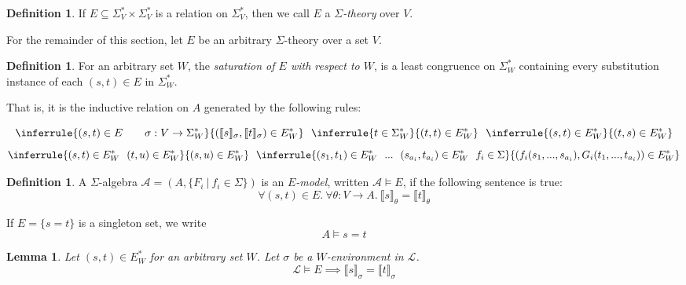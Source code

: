 \documentclass{msthesis}
\newtheorem{lemma}[theorem]{Lemma}
\theoremstyle{definition}
\newtheorem{definition}[theorem]{Definition}
\newcommand{\semof}[1]{\llbracket{#1}\rrbracket}
\newcommand{\Lmod}{\mathscr{L}}
\newcommand{\Amod}{\mathscr{A}}
\begin{document}
\begin{definition}
    If $E \subseteq \Sigma^*_V \times \Sigma^*_V$ is a relation on $\Sigma^*_V$, then we call 
    $E$ a \emph{$\Sigma$-theory} over $V$.
\end{definition}

For the remainder of this section, let $E$ be an arbitrary $\Sigma$-theory over a set $V$.
    
\begin{definition}
    For an arbitrary set $W$, the \emph{saturation of $E$ with respect to $W$}, is a least congruence on $\Sigma^*_W$ containing every substitution instance of each $(s,t)\in E$ in $\Sigma^*_W$. 
    
    That is, it is the inductive relation on $A$ generated by the following rules:
    
\[
    \inferrule{(s, t) \in E \qquad \sigma : V \to \Sigma^*_W}{(\semof{s}_\sigma, \semof{t}_\sigma) \in \thof{W}}\ \ \inferrule{t \in \Sigma^*_W}{(t, t) \in \thof{W}}\ \ \inferrule{(s, t) \in \thof{W}}{(t, s) \in \thof{W}}
\]
\[
    \inferrule{(s, t) \in \thof{W}\ \ (t, u) \in \thof{W}}{(s, u) \in \thof{W}}\ \  \inferrule{(s_1, t_1) \in \thof{W}\ \ ...\ \ (s_{a_i}, t_{a_i}) \in \thof{W}\ \ f_i \in \Sigma}{(f_i(s_1, ..., s_{a_i}), G_i(t_1, ..., t_{a_i})) \in \thof{W}}
\]
\end{definition}

\begin{definition}\label{def:models}
A $\Sigma$-algebra $\Amod = (A, \{F_i\ |\ f_i \in \Sigma\})$ is an \textit{$E$-model}, written $\Amod \models E$, if the following sentence is true:
\[ \forall (s, t) \in E.\ \forall \theta : V \to A.\ \semof{s}_\theta = \semof{t}_\theta \]
\end{definition}

If $E = \{s = t\}$ is a singleton set, we write
\[ A \models s = t \]

\begin{lemma}\label{lemma:EtoE*}
    Let $(s, t) \in E^*_W$ for an arbitrary set $W$.  Let $\sigma$ be a $W$-environment in $\Lmod$.  %
    \[ \Lmod \models E \implies \semof{s}_\sigma = \semof{t}_\sigma \]
\end{lemma}
\end{document}
